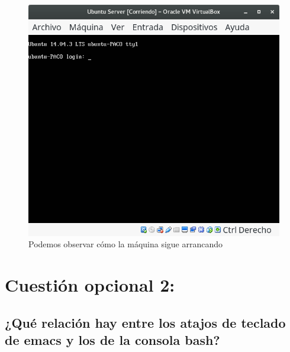 \begin{figure}[H] %
	\centering
	\includegraphics[scale=0.5]{figuras/figura10.png}  %
	
	
	\caption{Podemos observar cómo la máquina sigue arrancando}
	\label{figura10}
\end{figure}


\section{Cuestión opcional 2:}

\subsection{¿Qué relación hay entre los atajos de teclado de emacs y los de la consola bash?}

